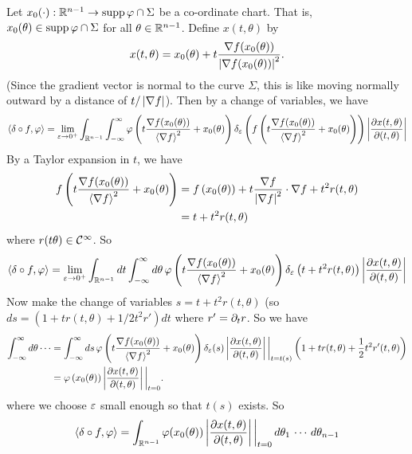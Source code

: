 \begin{exam}
\begin{enum}
    Let $x_0(\cdot): \mathbb{R}^{n-1} \to \operatorname{supp}\varphi\cap\Sigma$ be a co-ordinate chart.
    That is, $x_0(\theta)\in\operatorname{supp}\varphi\cap\Sigma$ for all $\theta\in\mathbb{R}^{n-1}$.
    Define $x(t,\theta)$ by
    \[ x(t,\theta)=x_0(\theta)+t\frac{\nabla f(x_0(\theta))}{\left\lvert \nabla f(x_0(\theta)) \right\rvert^2}. \]
    (Since the gradient vector is normal to the curve $\Sigma$, this is like moving normally outward by a distance of $t/\left\lvert \nabla f \right\rvert$).
    Then by a change of variables, we have
    \begin{equation*}
      {\left\langle \delta\circ f,\varphi\right\rangle} = \lim_{\varepsilon\to0^+} \int_{\mathbb{R}^{n-1}} \int_{-\infty}^\infty \varphi\left( t\frac{\nabla f(x_0(\theta))}{{\left\langle \nabla f \right\rangle}^2} + x_0(\theta) \right) \delta_\varepsilon\left( f\left( t\frac{\nabla f(x_0(\theta))}{{\left\langle \nabla f \right\rangle}^2} + x_0(\theta) \right) \right) \left\lvert \frac{\partial x(t,\theta)}{\partial(t,\theta)} \right\rvert
    \end{equation*}
    By a Taylor expansion in $t$, we have
    \begin{align*}
      f\left( t\frac{\nabla f(x_0(\theta))}{{\left\langle \nabla f \right\rangle}^2} + x_0(\theta) \right) &= f\left( x_0(\theta) \right) + t \frac{\nabla f}{\left\lvert \nabla f \right\rvert^2} \cdot\nabla f + t^2 r(t,\theta) \\
      &= t+t^2r(t,\theta)
    \end{align*}
    where $r(t\theta)\in\mathcal{C}^\infty$.
    So
    \begin{equation*}
      {\left\langle \delta\circ f,\varphi\right\rangle} = \lim_{\varepsilon\to0^+} \int_{\mathbb{R}^{n-1}} dt \int_{-\infty}^\infty d\theta \, \varphi\left( t\frac{\nabla f(x_0(\theta))}{{\left\langle \nabla f \right\rangle}^2} + x_0(\theta) \right) \delta_\varepsilon\left( t+t^2r(t,\theta) \right) \left\lvert \frac{\partial x(t,\theta)}{\partial(t,\theta)} \right\rvert
    \end{equation*}
    Now make the change of variables $s=t+t^2r(t,\theta)$ (so $ds=(1+tr(t,\theta)+1/2t^2r')dt$ where $r'=\partial_tr$.
    So we have
    \begin{align*}
      \int_{-\infty}^\infty d\theta \cdots &= \int_{-\infty}^\infty ds \, \varphi\left( t\frac{\nabla f(x_0(\theta))}{{\left\langle \nabla f \right\rangle}^2} + x_0(\theta) \right) \delta_\varepsilon(s) \left\lvert \frac{\partial x(t,\theta)}{\partial(t,\theta)} \right\rvert\bigg\vert_{t=t(s)} \left( 1+tr(t,\theta)+\frac12t^2r'(t,\theta) \right) \\
      &= \varphi\left( x_0(\theta) \right) \left\lvert \frac{\partial x(t,\theta)}{\partial(t,\theta)} \right\rvert\bigg\vert_{t=0}.
    \end{align*}
    where we choose $\varepsilon$ small enough so that $t(s)$ exists.
    So
    \begin{align*}
      \ang{\delta\circ f,\ph} &= \int_{\RR^{n-1}} \ph(x_0(\theta)) \abs{\frac{\p x(t,\theta)}{\p(t,\theta)}}\bigg\vert_{t=0} \, d\theta_1 \, \cdots \, d\theta_{n-1} \\

\end{align*}
\end{enum}
\end{exam}
